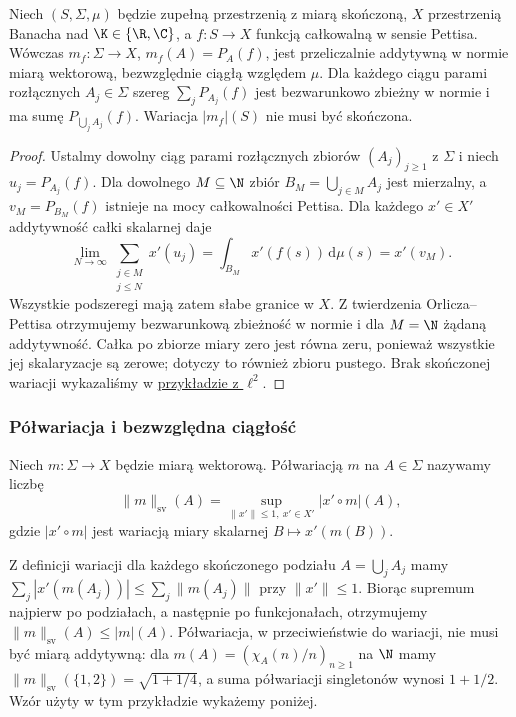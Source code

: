 \begin{twierdzenie}
\label{thm:pettis-vector-measure15b}
Niech $(S,\Sigma,\mu)$ będzie zupełną przestrzenią z miarą
skończoną, $X$ przestrzenią Banacha nad $\K\in\{\R,\C\}$,
a $f:S\to X$ funkcją całkowalną w sensie Pettisa.
Wówczas $m_f:\Sigma\to X$, $m_f(A)=P_A(f)$,
jest przeliczalnie addytywną w normie miarą wektorową,
bezwzględnie ciągłą względem $\mu$.
Dla każdego ciągu parami rozłącznych $A_j\in\Sigma$ szereg
$\sum_jP_{A_j}(f)$ jest bezwarunkowo zbieżny w normie
i ma sumę $P_{\bigcup_j A_j}(f)$.
Wariacja $|m_f|(S)$ nie musi być skończona.
\end{twierdzenie}
\begin{proof}
Ustalmy dowolny ciąg parami rozłącznych zbiorów
$(A_j)_{j\ge1}$ z $\Sigma$ i niech $u_j=P_{A_j}(f)$.
Dla dowolnego $M\subseteq\N$
zbiór $B_M=\bigcup_{j\in M}A_j$ jest mierzalny, a
$v_M=P_{B_M}(f)$ istnieje na mocy całkowalności Pettisa.
Dla każdego $x'\in X'$ addytywność całki skalarnej daje
\[
 \lim_{N\to\infty}\sum_{\substack{j\in M\\j\le N}}x'(u_j)
 =\int_{B_M}x'(f(s))\,\mathrm d\mu(s)=x'(v_M).
\]
Wszystkie podszeregi mają zatem słabe granice w $X$.
Z twierdzenia Orlicza--Pettisa otrzymujemy bezwarunkową
zbieżność w normie i dla $M=\N$ żądaną addytywność.
Całka po zbiorze miary zero jest równa zeru, ponieważ
wszystkie jej skalaryzacje są zerowe; dotyczy to również
zbioru pustego. Brak skończonej wariacji wykazaliśmy
w \hyperref[ex:pettis-infinite-variation15b]{przykładzie z $\ell^2$}.
\end{proof}

\subsubsection{Półwariacja i bezwzględna ciągłość}

\begin{definicja}
\label{def:vector-semivariation15b}
Niech $m:\Sigma\to X$ będzie miarą wektorową.
Półwariacją $m$ na $A\in\Sigma$ nazywamy liczbę
\[
 \|m\|_{\mathrm{sv}}(A)=\sup_{\|x'\|\le1,\ x'\in X'}
 |x'\circ m|(A),
\]
gdzie $|x'\circ m|$ jest wariacją miary skalarnej
$B\mapsto x'(m(B))$.
\end{definicja}

Z definicji wariacji dla każdego skończonego
podziału $A=\bigcup_j A_j$ mamy
$\sum_j|x'(m(A_j))|\le\sum_j\|m(A_j)\|$
przy $\|x'\|\le1$. Biorąc supremum najpierw po
podziałach, a następnie po funkcjonałach, otrzymujemy
$\|m\|_{\mathrm{sv}}(A)\le |m|(A)$.
Półwariacja, w przeciwieństwie do wariacji,
nie musi być miarą addytywną: dla
$m(A)=(\chi_A(n)/n)_{n\ge1}$ na $\N$ mamy
$\|m\|_{\mathrm{sv}}(\{1,2\})=\sqrt{1+1/4}$,
a suma półwariacji singletonów wynosi $1+1/2$.
Wzór użyty w tym przykładzie wykażemy poniżej.

